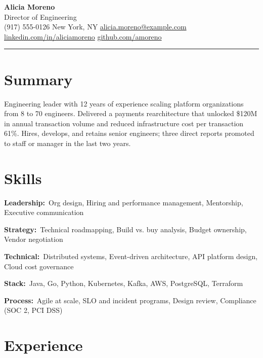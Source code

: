 \documentclass[letterpaper,11pt]{article}
\makeatletter
\newcommand{\csep}{\hspace{5pt}\textbar\hspace{5pt}}
\newcommand{\rSkill}[2]{\noindent\textbf{#1:}\ #2\par\vspace{3pt}}
\def\name{Alicia Moreno}
\def\role{Director of Engineering}
\def\phone{(917) 555-0126}
\def\location{New York, NY}
\def\email{alicia.moreno@example.com}
\def\LinkedIn{aliciamoreno}
\def\github{amoreno}
\makeatother
\begin{document}
\begin{center}
  {\LARGE\bfseries\color{bodytext}\name}\\[4pt]
  {\large\color{accent}\role}\\[6pt]
  {\small
    \phone\csep
    \location\csep
    \href{mailto:\email}{\email}\csep
    \href{https://linkedin.com/in/\LinkedIn}{linkedin.com/in/\LinkedIn}\csep
    \href{https://github.com/\github}{github.com/\github}}
\end{center}
\vspace{4pt}
{\color{accent}\rule{\linewidth}{1.4pt}}

\section{Summary}
Engineering leader with 12 years of experience scaling platform organizations
from 8 to 70 engineers. Delivered a payments rearchitecture that unlocked \$120M
in annual transaction volume and reduced infrastructure cost per transaction
61\%. Hires, develops, and retains senior engineers; three direct reports
promoted to staff or manager in the last two years.

\section{Skills}
\rSkill{Leadership}{Org design, Hiring and performance management, Mentorship, Executive communication}
\rSkill{Strategy}{Technical roadmapping, Build vs. buy analysis, Budget ownership, Vendor negotiation}
\rSkill{Technical}{Distributed systems, Event-driven architecture, API platform design, Cloud cost governance}
\rSkill{Stack}{Java, Go, Python, Kubernetes, Kafka, AWS, PostgreSQL, Terraform}
\rSkill{Process}{Agile at scale, SLO and incident programs, Design review, Compliance (SOC 2, PCI DSS)}

\section{Experience}
\end{document}

